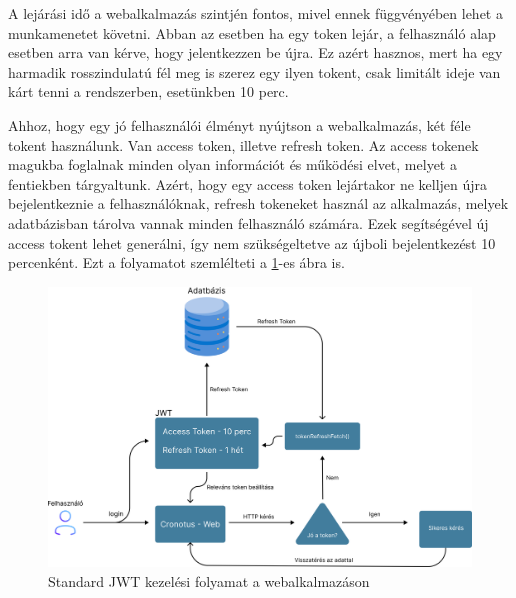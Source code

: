 A lejárási idő a webalkalmazás szintjén fontos, mivel ennek függvényében lehet a munkamenetet követni. Abban az esetben ha egy token lejár, a felhasználó alap esetben arra van kérve, hogy jelentkezzen be újra. Ez azért hasznos, mert ha egy harmadik rosszindulatú fél meg is szerez egy ilyen tokent, csak limitált ideje van kárt tenni a rendszerben, esetünkben 10 perc.

Ahhoz, hogy egy jó felhasználói élményt nyújtson a webalkalmazás, két féle tokent használunk. Van access token, illetve refresh token. Az access tokenek magukba foglalnak minden olyan információt és működési elvet, melyet a fentiekben tárgyaltunk. Azért, hogy egy access token lejártakor ne kelljen újra bejelentkeznie a felhasználóknak, refresh tokeneket használ az alkalmazás, melyek adatbázisban tárolva vannak minden felhasználó számára. Ezek segítségével új access tokent lehet generálni, így nem szükségeltetve az újboli bejelentkezést 10 percenként. Ezt a folyamatot szemlélteti a \ref{fig:jwt_standard_process}-es ábra is.

\newpage

\begin{figure}[h]
    \centering
    \includegraphics[width=\textwidth]{./images/jwt_auth_process.png}
    \caption{Standard JWT kezelési folyamat a webalkalmazáson}
    \label{fig:jwt_standard_process}
\end{figure}

